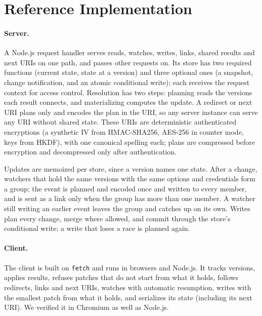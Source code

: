 \documentclass[11pt,a4paper]{article}
\begin{document}
\section{Reference Implementation}
\label{sec:impl}

\paragraph{Server.}
A Node.js request handler serves reads, watches, writes, links, shared results and next URIs on one path, and passes other requests on. Its store has two required functions (current state, state at a version) and three optional ones (a snapshot, change notification, and an atomic conditional write); each receives the request context for access control. Resolution has two steps: planning reads the versions each result connects, and materializing computes the update. A redirect or next URI plans only and encodes the plan in the URI, so any server instance can serve any URI without shared state. These URIs are deterministic authenticated encryptions (a synthetic IV from HMAC-SHA256, AES-256 in counter mode, keys from HKDF), with one canonical spelling each; plans are compressed before encryption and decompressed only after authentication.

Updates are memoized per store, since a version names one state. After a change, watchers that hold the same versions with the same options and credentials form a group; the event is planned and encoded once and written to every member, and is sent as a link only when the group has more than one member. A watcher still writing an earlier event leaves the group and catches up on its own. Writes plan every change, merge where allowed, and commit through the store's conditional write; a write that loses a race is planned again.

\paragraph{Client.}
The client is built on \texttt{fetch} and runs in browsers and Node.js. It tracks versions, applies results, refuses patches that do not start from what it holds, follows redirects, links and next URIs, watches with automatic resumption, writes with the smallest patch from what it holds, and serializes its state (including its next URI). We verified it in Chromium as well as Node.js.
\end{document}

